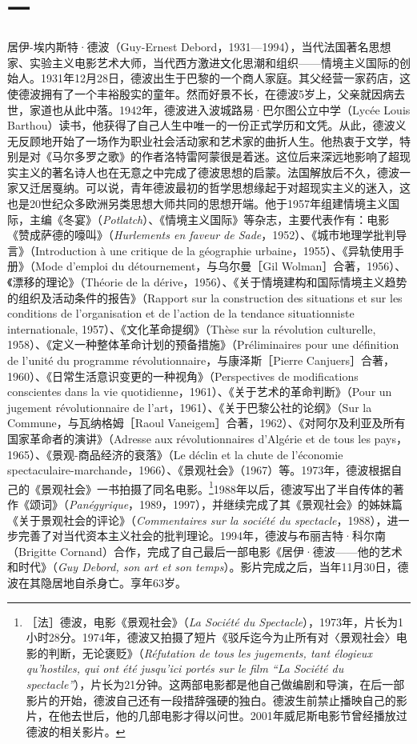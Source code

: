 \documentclass[fontset=fandol, a4paper, 12pt, openright]{ctexbook}
\begin{document}
\section*{一}

居伊-埃内斯特·德波（Guy-Ernest Debord，1931—1994），当代法国著名思想家、实验主义电影艺术大师，当代西方激进文化思潮和组织——情境主义国际的创始人。1931年12月28日，德波出生于巴黎的一个商人家庭。其父经营一家药店，这使德波拥有了一个丰裕殷实的童年。然而好景不长，在德波5岁上，父亲就因病去世，家道也从此中落。1942年，德波进入波城路易·巴尔图公立中学（Lycée Louis Barthou）读书，他获得了自己人生中唯一的一份正式学历和文凭。从此，德波义无反顾地开始了一场作为职业社会活动家和艺术家的曲折人生。他热衷于文学，特别是对《马尔多罗之歌》的作者洛特雷阿蒙很是着迷。这位后来深远地影响了超现实主义的著名诗人也在无意之中完成了德波思想的启蒙。法国解放后不久，德波一家又迁居戛纳。可以说，青年德波最初的哲学思想缘起于对超现实主义的迷入，这也是20世纪众多欧洲另类思想大师共同的思想开端。他于1957年组建情境主义国际，主编《冬宴》（\textit{Potlatch}）、《情境主义国际》等杂志，主要代表作有：电影《赞成萨德的嚎叫》（\textit{Hurlements en faveur de Sade}，1952）、《城市地理学批判导言》（Introduction à une critique de la géographie urbaine，1955）、《异轨使用手册》（Mode d'emploi du détournement，与乌尔曼［Gil Wolman］合著，1956）、《漂移的理论》（Théorie de la dérive，1956）、《关于情境建构和国际情境主义趋势的组织及活动条件的报告》（Rapport sur la construction des situations et sur les conditions de l'organisation et de l'action de la tendance situationniste internationale, 1957）、《文化革命提纲》（Thèse sur la révolution culturelle, 1958）、《定义一种整体革命计划的预备措施》（Préliminaires pour une définition de l'unité du programme révolutionnaire，与康泽斯［Pierre Canjuers］合著，1960）、《日常生活意识变更的一种视角》（Perspectives de modifications conscientes dans la vie quotidienne，1961）、《关于艺术的革命判断》（Pour un jugement révolutionnaire de l'art，1961）、《关于巴黎公社的论纲》（Sur la Commune，与瓦纳格姆［Raoul Vaneigem］合著，1962）、《对阿尔及利亚及所有国家革命者的演讲》（Adresse aux révolutionnaires d'Algérie et de tous les pays，1965）、《景观-商品经济的衰落》（Le déclin et la chute de l'économie spectaculaire-marchande，1966）、《景观社会》（1967）等。1973年，德波根据自己的《景观社会》一书拍摄了同名电影。\footnote{［法］德波，电影《景观社会》（\textit{La Société du Spectacle}），1973年，片长为1小时28分。1974年，德波又拍摄了短片《驳斥迄今为止所有对〈景观社会〉电影的判断，无论褒贬》（\textit{Réfutation de tous les jugements, tant élogieux qu'hostiles, qui ont été jusqu'ici portés sur le film “La Société du spectacle”}），片长为21分钟。这两部电影都是他自己做编剧和导演，在后一部影片的开始，德波自己还有一段措辞强硬的独白。德波生前禁止播映自己的影片，在他去世后，他的几部电影才得以问世。2001年威尼斯电影节曾经播放过德波的相关影片。}1988年以后，德波写出了半自传体的著作《颂词》（\textit{Panégyrique}，1989，1997），并继续完成了其《景观社会》的姊妹篇《关于景观社会的评论》（\textit{Commentaires sur la société du spectacle}，1988），进一步完善了对当代资本主义社会的批判理论。1994年，德波与布丽吉特·科尔南（Brigitte Cornand）合作，完成了自己最后一部电影《居伊·德波——他的艺术和时代》（\textit{Guy Debord, son art et son temps}）。影片完成之后，当年11月30日，德波在其隐居地自杀身亡。享年63岁。
\end{document}
